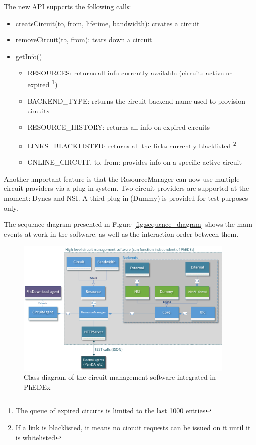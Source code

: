 The new API supports the following calls:
\begin{itemize}
  \item createCircuit(to, from, lifetime, bandwidth): creates a circuit
  \item removeCircuit(to, from): tears down a circuit
  \item getInfo()
	\begin{itemize}
		\item RESOURCES: returns all info currently available (circuits active or expired
		\footnote{The queue of expired circuits is limited to the last 1000 entries})
		\item BACKEND\_TYPE: returns the circuit backend name used to provision circuits
		\item RESOURCE\_HISTORY: returns all info on expired circuits
		\item LINKS\_BLACKLISTED: returns all the links currently blacklisted
		\footnote{If a link is blacklisted, it means no circuit requests can be issued on it
		until it is whitelisted}
		\item ONLINE\_CIRCUIT, to, from: provides info on a specific active circuit
	\end{itemize}
\end{itemize}

Another important feature is that the ResourceManager can now use multiple circuit
providers via a plug-in system. Two circuit providers are supported at the moment: 
Dynes\cite{DYNES} and NSI\cite{NSI}.
A third plug-in (Dummy) is provided for test purposes only.

The sequence diagram presented in Figure \ref{fig:sequence_diagram} shows the main events
at work in the software, as well as the interaction order  between them.

\begin{figure}[h]
  \centering
  \includegraphics[width=0.95\textwidth]{Figures/Circuit_framework-class_diagram.png}
  \caption{Class diagram of the circuit management software integrated in PhEDEx}
  \label{fig:class_diagram}
\end{figure} 

